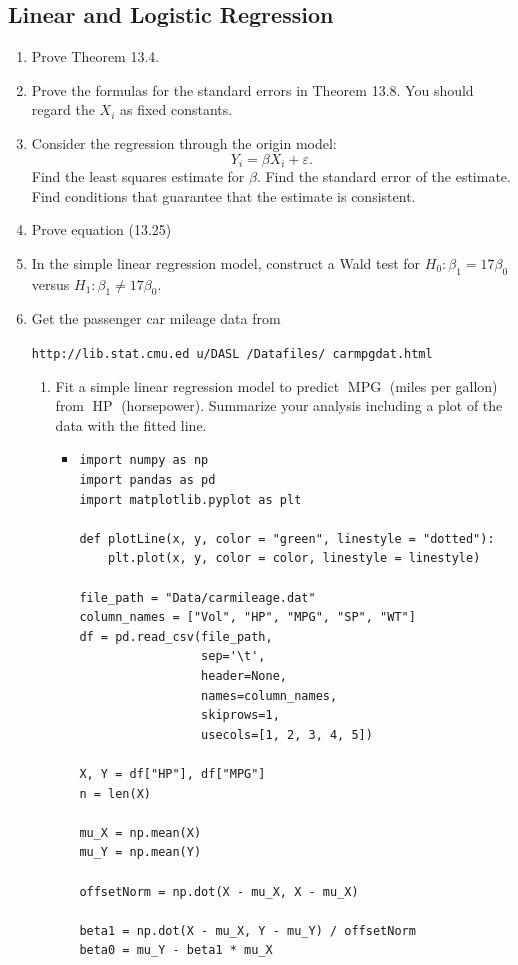 \documentclass{article}
\begin{document}
\subsection{Linear and Logistic Regression}
\begin{enumerate}
	\item Prove Theorem 13.4.
	\item Prove the formulas for the standard errors in Theorem 13.8. You should regard the $X_i$ as fixed constants.
	\item Consider the regression through the origin model:
	$$
	Y_i = \beta X_i + \varepsilon.
	$$
	Find the least squares estimate for $\beta$. Find the standard error of the estimate. Find conditions that guarantee that the estimate is consistent.
	\item Prove equation (13.25)
	\item In the simple linear regression model, construct a Wald test for $H_0 : \beta_1 = 17\beta_0$ versus $H_1 : \beta_1 \neq 17\beta_0$.
	\item Get the passenger car mileage data from
	
	\texttt{http://lib.stat.cmu.ed u/DASL /Datafiles/ carmpgdat.html}
		\begin{enumerate}
			\item Fit a simple linear regression model to predict $\operatorname{MPG}$ (miles per gallon) from $\operatorname{HP}$ (horsepower). Summarize your analysis including a plot of the data with the fitted line.
				\begin{itemize}
				\item
				\begin{verbatim}
import numpy as np
import pandas as pd
import matplotlib.pyplot as plt

def plotLine(x, y, color = "green", linestyle = "dotted"):
    plt.plot(x, y, color = color, linestyle = linestyle)

file_path = "Data/carmileage.dat"
column_names = ["Vol", "HP", "MPG", "SP", "WT"]
df = pd.read_csv(file_path,
                 sep='\t',
                 header=None,
                 names=column_names,
                 skiprows=1,
                 usecols=[1, 2, 3, 4, 5])

X, Y = df["HP"], df["MPG"]
n = len(X)

mu_X = np.mean(X)
mu_Y = np.mean(Y)

offsetNorm = np.dot(X - mu_X, X - mu_X)

beta1 = np.dot(X - mu_X, Y - mu_Y) / offsetNorm
beta0 = mu_Y - beta1 * mu_X


\end{verbatim}
\end{itemize}
\end{enumerate}
\end{enumerate}
\end{document}
